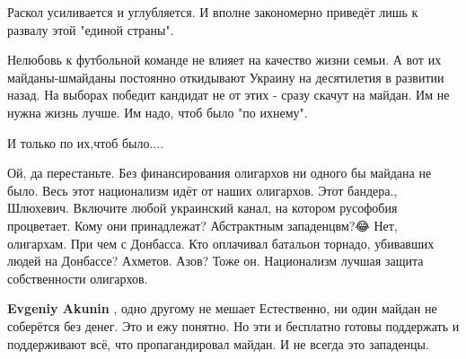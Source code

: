 \begin{itemize}
Раскол усиливается и углубляется. И вполне закономерно приведёт лишь к развалу
этой "единой страны".

 

Нелюбовь к футбольной команде не влияет на качество жизни семьи. А вот их
майданы-шмайданы постоянно откидывают Украину на десятилетия в развитии назад.
На выборах победит кандидат не от этих - сразу скачут на майдан. Им не нужна
жизнь лучше. Им надо, чтоб было "по ихнему".

\begin{itemize}
 
И только по их,чтоб было....

 

Ой, да перестаньте. Без финансирования олигархов ни одного бы майдана не было.
Весь этот национализм идёт от наших олигархов. Этот бандера., Шлюхевич.
Включите любой украинский канал, на котором русофобия процветает. Кому они
принадлежат? Абстрактным западенцвм?😂 Нет, олигархам. При чем с Донбасса. Кто
оплачивал батальон торнадо, убивавших людей на Донбассе? Ахметов. Азов? Тоже
он. Национализм лучшая защита собственности олигархов.


 
\textbf{Evgeniy Akunin} , одно другому не мешает Естественно, ни один майдан не
соберётся без денег. Это и ежу понятно. Но эти и бесплатно готовы поддержать и
поддерживают всё, что пропагандировал майдан. И не всегда это западенцы.

 

\end{itemize}
\end{itemize}
